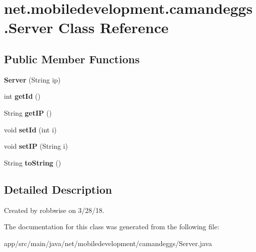 \hypertarget{classnet_1_1mobiledevelopment_1_1camandeggs_1_1_server}{}\section{net.\+mobiledevelopment.\+camandeggs.\+Server Class Reference}
\label{classnet_1_1mobiledevelopment_1_1camandeggs_1_1_server}
\subsection*{Public Member Functions}
\begin{DoxyCompactItemize}
\item 
\mbox{\label{classnet_1_1mobiledevelopment_1_1camandeggs_1_1_server_a773bd30a67a11c01639d96bf5205a762}} 
{\bfseries Server} (String ip)
\item 
\mbox{\label{classnet_1_1mobiledevelopment_1_1camandeggs_1_1_server_a2c9a1872e2e6ff97b8f4ac9cb34d71f5}} 
int {\bfseries get\+Id} ()
\item 
\mbox{\label{classnet_1_1mobiledevelopment_1_1camandeggs_1_1_server_ac4fc0647dde28db00e875573530b860c}} 
String {\bfseries get\+IP} ()
\item 
\mbox{\label{classnet_1_1mobiledevelopment_1_1camandeggs_1_1_server_a1be30996fde32971d7414df0adf7df1b}} 
void {\bfseries set\+Id} (int i)
\item 
\mbox{\label{classnet_1_1mobiledevelopment_1_1camandeggs_1_1_server_a54a629226e0ed116a93405107d91b8b3}} 
void {\bfseries set\+IP} (String i)
\item 
\mbox{\label{classnet_1_1mobiledevelopment_1_1camandeggs_1_1_server_aa2e205a94f8c7ae112cc50c308cd0000}} 
String {\bfseries to\+String} ()
\end{DoxyCompactItemize}


\subsection{Detailed Description}
Created by robbwise on 3/28/18. 

The documentation for this class was generated from the following file\+:\begin{DoxyCompactItemize}
\item 
app/src/main/java/net/mobiledevelopment/camandeggs/Server.\+java\end{DoxyCompactItemize}
